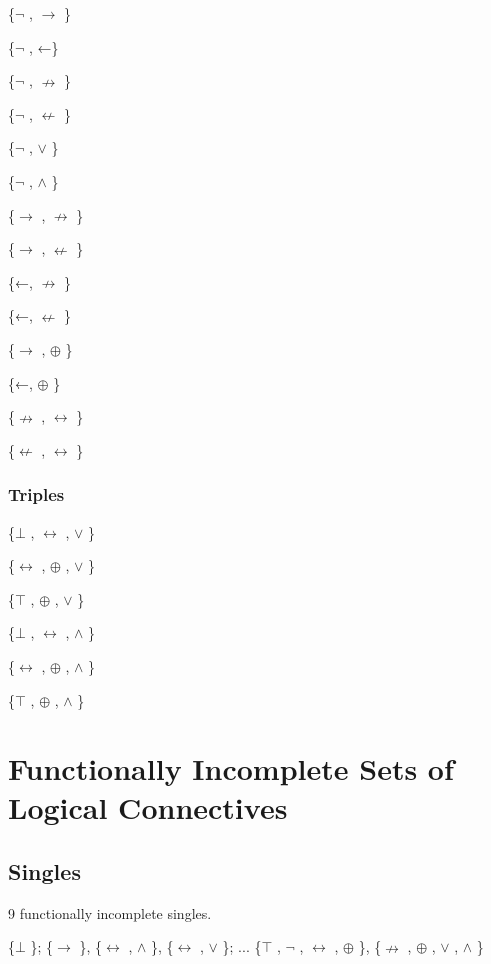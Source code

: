 \{$\neg$ , $\to$ \}

\{$\neg$ , ←\}

\{$\neg$ , $\nrightarrow$ \}

\{$\neg$ , $\nleftarrow$ \}

\{$\neg$ , $\lor$ \}

\{$\neg$ , $\land$ \}

\{$\to$ , $\nrightarrow$ \}

\{$\to$ , $\nleftarrow$ \}

\{←, $\nrightarrow$ \}

\{←, $\nleftarrow$ \}

\{$\to$ , $\oplus$ \}

\{←, $\oplus$ \}

\{$\nrightarrow$ , $\leftrightarrow$ \}

\{$\nleftarrow$ , $\leftrightarrow$ \}

\hypertarget{triples}{%
\subsubsection{Triples}\label{triples}}

\{$\bot$ , $\leftrightarrow$ , $\lor$ \}

\{$\leftrightarrow$ , $\oplus$ , $\lor$ \}

\{$\top$ , $\oplus$ , $\lor$ \}

\{$\bot$ , $\leftrightarrow$ , $\land$ \}

\{$\leftrightarrow$ , $\oplus$ , $\land$ \}

\{$\top$ , $\oplus$ , $\land$ \}

\hypertarget{functionally-incomplete-sets-of-logical-connectives}{%
\section{Functionally Incomplete Sets of Logical
Connectives}\label{functionally-incomplete-sets-of-logical-connectives}}

\hypertarget{singles-1}{%
\subsection{Singles}\label{singles-1}}

9 functionally incomplete singles.

\{$\bot$ \}; \{$\to$ \}, \{$\leftrightarrow$ , $\land$ \}, \{$\leftrightarrow$ , $\lor$ \}; ... \{$\top$ , $\neg$ , $\leftrightarrow$ , $\oplus$ \}, \{$\nrightarrow$ , $\oplus$ , $\lor$ , $\land$ \}


